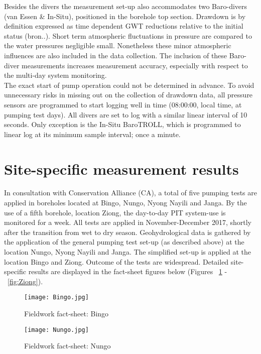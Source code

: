 Besides the divers the measurement set-up also accommodates two Baro-divers (van Essen \& In-Situ), positioned in the borehole top section. Drawdown is by definition expressed as time dependent GWT reductions relative to the initial status (bron..). Short term atmospheric fluctuations in pressure are compared to the water pressures negligible small. Nonetheless these minor atmospheric influences are also included in the data collection. The inclusion of these Baro-diver measurements increases measurement accuracy, especially with respect to the multi-day system monitoring.
\bigskip \\
The exact start of pump operation could not be determined in advance. To avoid unnecessary risks in missing out on the collection of drawdown data, all pressure sensors are programmed to start logging well in time (08:00:00, local time, at pumping test days). All divers are set to log with a similar linear interval of 10 seconds. Only exception is the In-Situ BaroTROLL, which is programmed to linear log at its minimum sample interval; once a minute. 


\section{Site-specific measurement results}
\label{section:fieldworkresults}
In consultation with Conservation Alliance (CA), a total of five pumping tests are applied in boreholes located at Bingo, Nungo, Nyong Nayili and Janga. By the use of a fifth borehole, location Ziong, the day-to-day PIT system-use is monitored for a week. All tests are applied in November-December 2017, shortly after the transition from wet to dry season. Geohydrological data is gathered by the application of the general pumping test set-up (as described above) at the location Nungo, Nyong Nayili and Janga. The simplified set-up is applied at the location Bingo and Ziong. Outcome of the tests are widespread. Detailed site-specific results are displayed in the fact-sheet figures below (Figures ~\ref{fig:Bingo} -~\ref{fig:Ziong}).

\begin{figure}[h!]
 \centering\texttt{[image: Bingo.jpg]}
 \captionsetup{justification=centering}
 \caption{Fieldwork fact-sheet: Bingo}
 \label{fig:Bingo}
\end{figure} 

\begin{figure}[h!]
 \centering\texttt{[image: Nungo.jpg]}
 \captionsetup{justification=centering}
 \caption{Fieldwork fact-sheet: Nungo}
 \label{fig:Nungo}
\end{figure} 

